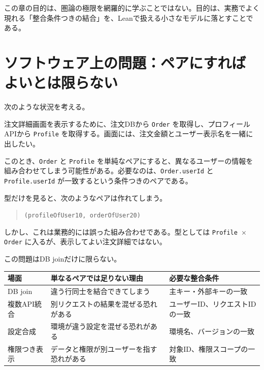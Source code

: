 
この章の目的は、圏論の極限を網羅的に学ぶことではない。目的は、実務でよく現れる「整合条件つきの結合」を、Leanで扱える小さなモデルに落とすことである。

\section{ソフトウェア上の問題：ペアにすればよいとは限らない}

次のような状況を考える。

\begin{softwarebox}
注文詳細画面を表示するために、注文DBから \texttt{Order} を取得し、プロフィールAPIから \texttt{Profile} を取得する。画面には、注文金額とユーザー表示名を一緒に出したい。

このとき、\texttt{Order} と \texttt{Profile} を単純なペアにすると、異なるユーザーの情報を組み合わせてしまう可能性がある。必要なのは、\texttt{Order.userId} と \texttt{Profile.userId} が一致するという条件つきのペアである。
\end{softwarebox}

型だけを見ると、次のようなペアは作れてしまう。

\begin{quote}
\texttt{(profileOfUser10, orderOfUser20)}
\end{quote}

しかし、これは業務的には誤った組み合わせである。型としては \texttt{Profile \ensuremath{\times} Order} に入るが、表示してよい注文詳細ではない。

この問題はDB joinだけに限らない。

\begin{center}
\begin{tabular}{lll}
\toprule
場面 & 単なるペアでは足りない理由 & 必要な整合条件 \\
\midrule
DB join & 違う行同士を結合できてしまう & 主キー・外部キーの一致 \\
複数API統合 & 別リクエストの結果を混ぜる恐れがある & ユーザーID、リクエストIDの一致 \\
設定合成 & 環境が違う設定を混ぜる恐れがある & 環境名、バージョンの一致 \\
権限つき表示 & データと権限が別ユーザーを指す恐れがある & 対象ID、権限スコープの一致 \\
\bottomrule
\end{tabular}
\end{center}

